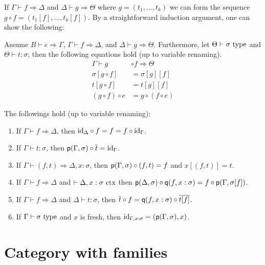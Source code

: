 \documentclass[a4paper]{article}
\begin{document}
If $\Gamma \vdash f \Rightarrow \Delta$ and $\Delta \vdash g \Rightarrow \Theta$ where $g = (t_1,\ldots,t_k)$ we can form the sequence $g \circ f = (t_1[f],\ldots,t_k[f])$.
By a straightforward induction argument, one can show the following:

\begin{proposition}
  Assume $B \vdash e \Rightarrow \Gamma$, $\Gamma \vdash f \Rightarrow \Delta$, and $\Delta \vdash g \Rightarrow \Theta$.
  Furthermore, let $\Theta \vdash \sigma~\mathrm{type}$ and $\Theta \vdash t : \sigma$; then the following equations hold (up to variable renaming).
  \begin{align*}
    \Gamma \vdash g &\circ f \Rightarrow \Theta\\
    \sigma[g \circ f] &= \sigma[g][f]\\
    t[g \circ f] &= t[g][f]\\
    (g \circ f) \circ e &= g \circ (f \circ e)
  \end{align*}
\end{proposition}

\begin{proposition}
  The followings hold (up to variable renaming):
  \begin{enumerate}
  \item If $\Gamma \vdash f \Rightarrow \Delta$, then $\mathrm{id}_{\Delta} \circ f = f = f \circ \mathrm{id}_{\Gamma}$.
  \item If $\Gamma \vdash t : \sigma$, then $\operatorname{\mathsf{p}}(\Gamma,\sigma) \circ \overline{t} = \mathrm{id}_{\Gamma}$.
  \item If $\Gamma \vdash (f,t) \Rightarrow \Delta,x : \sigma$, then $\operatorname{\mathsf{p}}(\Gamma,\sigma) \circ (f, t) = f$ and $x[(f,t)] = t$.
  \item If $\Gamma \vdash f \Rightarrow \Delta$ and $\vdash \Delta,x : \sigma~\mathrm{ctx}$ then $\operatorname{\mathsf{p}}(\Delta,\sigma) \circ \operatorname{\mathsf{q}}(f,x:\sigma) = f \circ \operatorname{\mathsf{p}}(\Gamma,\sigma[f])$.
  \item If $\Gamma \vdash f \Rightarrow \Delta$ and $\Delta \vdash t : \sigma$, then $\overline{t} \circ f = \operatorname{\mathsf{q}}(f,x : \sigma) \circ \overline{t[f]}$.
  \item If $\Gamma \vdash \sigma~\mathrm{type}$ and $x$ is fresh, then $\mathrm{id}_{\Gamma,x:\sigma} = (\operatorname{\mathsf{p}}(\Gamma,\sigma),x)$.
  \end{enumerate}
\end{proposition}

\section{Category with families}\label{sec:cwf}
\end{document}
